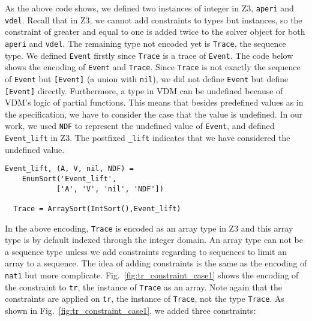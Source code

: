 As the above code shows, we defined two instances of integer in Z3, {\tt aperi} and {\tt vdel}. Recall that in Z3, we cannot add constraints to types but instances, so the constraint of greater and equal to one is added twice to the solver object for both {\tt aperi} and {\tt vdel}. The remaining type not encoded yet is {\tt Trace}, the sequence type. We defined {\tt Event} firstly since {\tt Trace} is a trace of {\tt Event}. The code below shows the encoding of {\tt Event} and {\tt Trace}. Since {\tt Trace} is not exactly the sequence of {\tt Event} but {\tt [Event]} (a union with {\tt nil}), we did not define {\tt Event} but define {\tt [Event]} directly. Furthermore, a type in VDM can be undefined because of VDM's logic of partial functions. This means that besides predefined values as in the specification, we have to consider the case that the value is undefined. In our work, we used {\tt NDF} to represent the undefined value of {\tt Event}, and defined {\tt Event\_lift} in Z3. The postfixed {\tt \_lift} indicates that we have considered the undefined value.

\begin{mdframed}[roundcorner=5pt,shadow=true]
\begin{Verbatim}[fontsize=\small]
  Event_lift, (A, V, nil, NDF) = 
    EnumSort('Event_lift', 
            ['A', 'V', 'nil', 'NDF'])

  Trace = ArraySort(IntSort(),Event_lift)
\end{Verbatim}
\end{mdframed}

In the above encoding, {\tt Trace} is encoded as an array type in Z3 and this array type is by default indexed through the integer domain. An array type can not be a sequence type unless we add constraints regarding to sequences to limit an array to a sequence. The idea of adding constraints is the same as the encoding of {\tt nat1} but more complicate. Fig.~\ref{fig:tr_constraint_case1} shows the encoding of the constraint to {\tt tr}, the instance of {\tt Trace} as an array. Note again that the constraints are applied on {\tt tr}, the instance of {\tt Trace}, not the type {\tt Trace}. As shown in Fig.~\ref{fig:tr_constraint_case1}, we added three constraints: 

